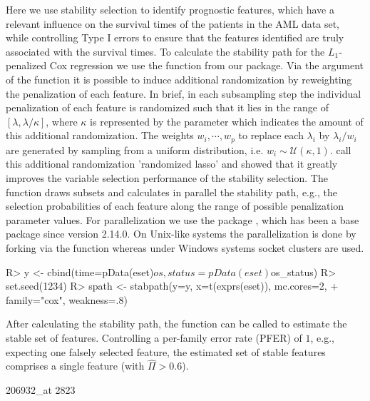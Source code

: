 \documentclass[nojss]{jss}
\begin{document}
Here we use stability selection to identify prognostic features, which have a relevant influence on the survival times of the patients in the AML data set, while controlling Type I errors to ensure that the features identified are truly associated with the survival times.
To calculate the stability path for the $L_1$-penalized Cox regression we use the function  from our  package. Via the  argument of the function  it is possible to induce additional randomization by reweighting the penalization of each feature. In brief, in each subsampling step the individual penalization of each feature is randomized such that it lies in the range of $[\lambda,\lambda/\kappa]$, where $\kappa$ is represented by the  parameter which indicates the amount of this additional randomization. The weights $w_{i},\cdots,w_{p}$ to replace each $\lambda_{i}$ by $\lambda_{i}/w_{i}$ are generated by sampling from a uniform distribution, i.e. $w_{i} \sim \mathcal{U}(\kappa,1)$. \citet{MeinshausenBuehlmann2010} call this additional randomization 'randomized lasso' and showed that it greatly improves the variable selection performance of the stability selection. The function  draws subsets and calculates in parallel the stability path, e.g., the selection probabilities of each feature along the range of possible penalization parameter values. For parallelization we use the package , which has been a base package since  version 2.14.0. On Unix-like systems the parallelization is done by forking via the function  whereas under Windows systems socket clusters are used. 

\begin{Schunk}
\begin{Sinput}
R> y <- cbind(time=pData(eset)$os, status=pData(eset)$os_status)
R> set.seed(1234)
R> spath <- stabpath(y=y, x=t(exprs(eset)), mc.cores=2,
+                          family="cox", weakness=.8)
\end{Sinput}
\end{Schunk}


After calculating the stability path, the function  can be called to estimate the stable set of features. Controlling a per-family error rate (PFER) of $1$, e.g., expecting one falsely selected feature, the estimated set of stable features comprises a single feature (with $\hat\Pi>0.6$).

\begin{Schunk}
\begin{Soutput}
206932_at 
     2823 
\end{Soutput}
\end{Schunk}
\end{document}
